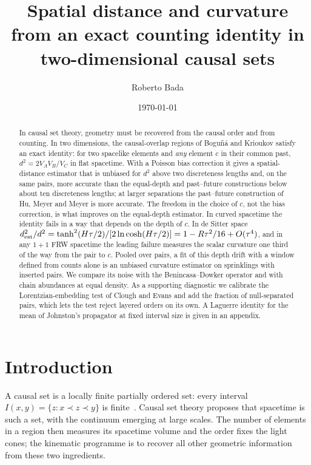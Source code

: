 \documentclass[prd,twocolumn,superscriptaddress,nofootinbib,amsmath,amssymb,floatfix]{revtex4-2}
\begin{document}
\title{Spatial distance and curvature from an exact counting identity in two-dimensional causal sets}

\author{Roberto Bada}

\date{\today}

\begin{abstract}
In causal set theory, geometry must be recovered from the causal order and from counting. In two dimensions, the causal-overlap regions of Bogu\~n\'a and Krioukov satisfy an exact identity: for two spacelike elements and \emph{any} element $c$ in their common past, $d^2=2V_AV_B/V_C$ in flat spacetime. With a Poisson bias correction it gives a spatial-distance estimator that is unbiased for $d^2$ above two discreteness lengths and, on the same pairs, more accurate than the equal-depth and past--future constructions below about ten discreteness lengths; at larger separations the past--future construction of Hu, Meyer and Meyer is more accurate. The freedom in the choice of $c$, not the bias correction, is what improves on the equal-depth estimator. In curved spacetime the identity fails in a way that depends on the depth of $c$. In de Sitter space $d^2_{\rm est}/d^2=\tanh^2(H\tau/2)/[2\ln\cosh(H\tau/2)]=1-R\tau^2/16+O(\tau^4)$, and in any $1+1$ FRW spacetime the leading failure measures the scalar curvature one third of the way from the pair to $c$. Pooled over pairs, a fit of this depth drift with a window defined from counts alone is an unbiased curvature estimator on sprinklings with inserted pairs. We compare its noise with the Benincasa--Dowker operator and with chain abundances at equal density. As a supporting diagnostic we calibrate the Lorentzian-embedding test of Clough and Evans and add the fraction of null-separated pairs, which lets the test reject layered orders on its own. A Laguerre identity for the mean of Johnston's propagator at fixed interval size is given in an appendix.
\end{abstract}

\maketitle

\section{Introduction}\label{sec:intro}
A causal set is a locally finite partially ordered set: every interval $I(x,y)=\{z:x\prec z\prec y\}$ is finite~\cite{BLMS87,Surya19}. Causal set theory proposes that spacetime is such a set, with the continuum emerging at large scales. The number of elements in a region then measures its spacetime volume and the order fixes the light cones; the kinematic programme is to recover all other geometric information from these two ingredients.
\end{document}
